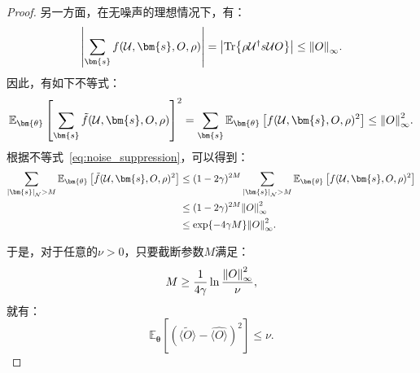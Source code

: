 \begin{proof}
    另一方面，在无噪声的理想情况下，有：
    \begin{equation}
        \abs{\sum_{\bm{s}}f(\mathcal{U},\bm{s},O,\rho)}=\abs{\Tr{\rho \mathcal{U}^\dagger s \mathcal{U} O}}\leq\norm{O}_\infty.
    \end{equation}
    因此，有如下不等式：
    \begin{equation}
        \mathbb{E}_{\bm{\theta}}\left[ \sum_{\bm{s}}\tilde{f}(\mathcal{U},\bm{s},O,\rho)\right]^2=\sum_{\bm{s}}\mathbb{E}_{\bm{\theta}}\left[f(\mathcal{U},\bm{s},O,\rho)^2\right]\leq\norm{O}_\infty^2.
    \end{equation}
    根据不等式~\eqref{eq:noise_suppression}，可以得到：
    \begin{equation}
        \begin{aligned}
            \sum_{\abs{\bm{s}}_{\mathcal{N}}>M}\mathbb{E}_{\bm{\theta}}\left[\tilde{f}(\mathcal{U},\bm{s},O,\rho)^2\right] &\leq (1-2\gamma)^{2M} \sum_{\abs{\bm{s}}_{\mathcal{N}}>M}\mathbb{E}_{\bm{\theta}}\left[f(\mathcal{U},\bm{s},O,\rho)^2\right]\\
            &\leq (1-2\gamma)^{2M} \norm{O}_\infty^2\\
            &\leq \exp{-4\gamma M} \norm{O}_\infty^2.
        \end{aligned}
    \end{equation}

    于是，对于任意的$\nu > 0$，只要截断参数$M$满足：
    \begin{equation}
        M\geq\frac{1}{4\gamma}\ln{\frac{\norm{O}_\infty^2}{\nu}},
    \end{equation}
    就有：
    \begin{equation}
        \mathbb{E}_{\bm{\theta}}\left[\left(\widetilde{\langle O\rangle}-\widehat{\langle O\rangle}\right)^2\right]\leq\nu.
    \end{equation}
\end{proof}